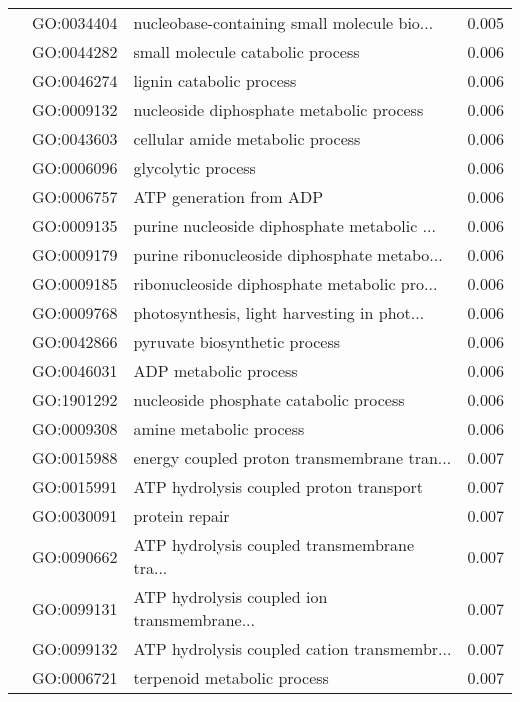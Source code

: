 \begin{longtable}{lllr}
   & GO:0034404 &  nucleobase-containing small molecule bio... &         0.005 \\
   & GO:0044282 &             small molecule catabolic process &         0.006 \\
   & GO:0046274 &                     lignin catabolic process &         0.006 \\
   & GO:0009132 &     nucleoside diphosphate metabolic process &         0.006 \\
   & GO:0043603 &             cellular amide metabolic process &         0.006 \\
   & GO:0006096 &                           glycolytic process &         0.006 \\
   & GO:0006757 &                      ATP generation from ADP &         0.006 \\
   & GO:0009135 &  purine nucleoside diphosphate metabolic ... &         0.006 \\
   & GO:0009179 &  purine ribonucleoside diphosphate metabo... &         0.006 \\
   & GO:0009185 &  ribonucleoside diphosphate metabolic pro... &         0.006 \\
   & GO:0009768 &  photosynthesis, light harvesting in phot... &         0.006 \\
   & GO:0042866 &                pyruvate biosynthetic process &         0.006 \\
   & GO:0046031 &                        ADP metabolic process &         0.006 \\
   & GO:1901292 &       nucleoside phosphate catabolic process &         0.006 \\
   & GO:0009308 &                      amine metabolic process &         0.006 \\
   & GO:0015988 &  energy coupled proton transmembrane tran... &         0.007 \\
   & GO:0015991 &      ATP hydrolysis coupled proton transport &         0.007 \\
   & GO:0030091 &                               protein repair &         0.007 \\
   & GO:0090662 &  ATP hydrolysis coupled transmembrane tra... &         0.007 \\
   & GO:0099131 &  ATP hydrolysis coupled ion transmembrane... &         0.007 \\
   & GO:0099132 &  ATP hydrolysis coupled cation transmembr... &         0.007 \\
   & GO:0006721 &                  terpenoid metabolic process &         0.007 \\

\end{longtable}
